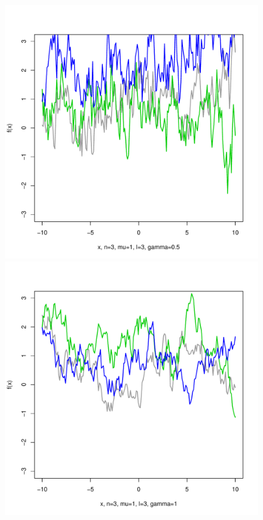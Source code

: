 \documentclass[12pt,letterpaper]{article}
\begin{document}
\begin{figure}
\begin{center}
\includegraphics[scale=0.2]{hw321/n3-m1-l3-g1.pdf}
\includegraphics[scale=0.2]{hw321/n3-m1-l3-g2.pdf}

\end{center}
\end{figure}
\end{document}
